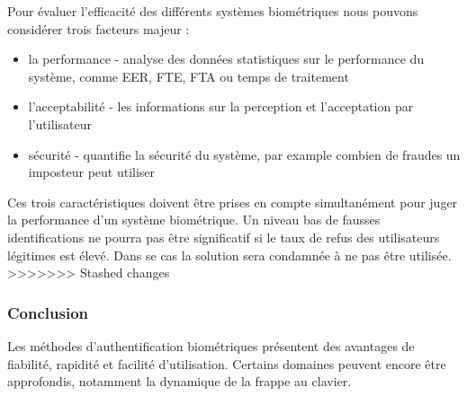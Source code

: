Pour évaluer l'efficacité des différents systèmes biométriques nous pouvons considérer trois facteurs majeur :\\

\begin{itemize}
\item la performance - analyse des données statistiques sur le performance du système, comme EER, FTE, FTA ou temps de traitement
\item l'acceptabilité - les informations sur la perception et l'acceptation par l'utilisateur 
\item sécurité - quantifie la sécurité du système, par example combien de fraudes un imposteur peut utiliser\\
\end{itemize}

Ces trois caractéristiques doivent être prises en compte simultanément pour juger la performance d'un système biométrique. Un niveau bas de fausses identifications ne pourra pas être significatif si le taux de refus des utilisateurs légitimes est élevé. Dans se cas la solution sera condamnée à ne pas être utilisée.
>>>>>>> Stashed changes

\subsubsection{Conclusion}

Les méthodes d'authentification biométriques présentent des avantages de fiabilité, rapidité et facilité d'utilisation. Certains domaines peuvent encore être approfondis, notamment la dynamique de la frappe au clavier.
